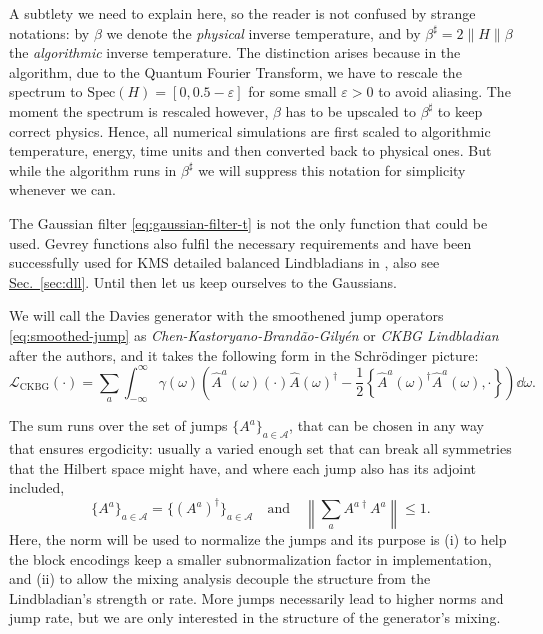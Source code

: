 A subtlety we need to explain here, so the reader is not confused by strange notations: by $\beta$ we denote the \emph{physical} inverse temperature, and by $\beta^\sharp = 2 \|H\| \beta$ the \emph{algorithmic} inverse temperature. The distinction arises because in the algorithm, due to the Quantum Fourier Transform, we have to rescale the spectrum to $\mathrm{Spec}(H) = [0, 0.5 - \varepsilon]$ for some small $\varepsilon > 0$ to avoid aliasing. The moment the spectrum is rescaled however, $\beta$ has to be upscaled to $\beta^\sharp$ to keep correct physics. Hence, all numerical simulations are first scaled to algorithmic temperature, energy, time units and then converted back to physical ones. But while the algorithm runs in $\beta^\sharp$ we will suppress this notation for simplicity whenever we can.

The Gaussian filter \eqref{eq:gaussian-filter-t} is not the only function that could be used. Gevrey functions also fulfil the necessary requirements and have been successfully used for KMS detailed balanced Lindbladians in \cite{ding2025efficient}, also see \hyperref[sec:dll]{Sec.~\ref*{sec:dll}}. Until then let us keep ourselves to the Gaussians. 

We will call the Davies generator with the smoothened jump operators \eqref{eq:smoothed-jump} as \textit{Chen-Kastoryano-Brandão-Gilyén} or \textit{CKBG Lindbladian} after the authors, and it takes the following form in the Schrödinger picture:
\begin{equation}
    \label{eq:L-ckbg}
    \mathcal{L}_\text{CKBG}(\cdot) = \sum_{a} \int_{-\infty}^{\infty} \gamma(\omega)\left(\hat{A}^a(\omega)(\cdot)\hat{A}(\omega)^\dagger -\frac{1}{2}\left\{\hat{A}^a(\omega)^\dagger \hat{A}^a(\omega), \cdot \right\}\right)\dd\omega .
    \tag{ckbg-l}
\end{equation}

The sum runs over the set of jumps $\{A^a\}_{a\in\mathcal{A}}$, that can be chosen in any way that ensures ergodicity: usually a varied enough set that can break all symmetries that the Hilbert space might have, and where each jump also has its adjoint included,
\begin{equation}
    \label{eq:ergodic-set-jumps}
    \{A^a\}_{a\in\mathcal{A}} = \{(A^a)^\dagger\}_{a\in\mathcal{A}} \quad\text{and}\quad \left\|\sum_a A^{a\dagger} A^a\right\| \leq 1.
\end{equation}
Here, the norm will be used to normalize the jumps and its purpose is (i) to help the block encodings keep a smaller subnormalization factor in implementation, and (ii) to allow the mixing analysis decouple the structure from the Lindbladian's strength or rate. More jumps necessarily lead to higher norms and jump rate, but we are only interested in the structure of the generator's mixing. 

